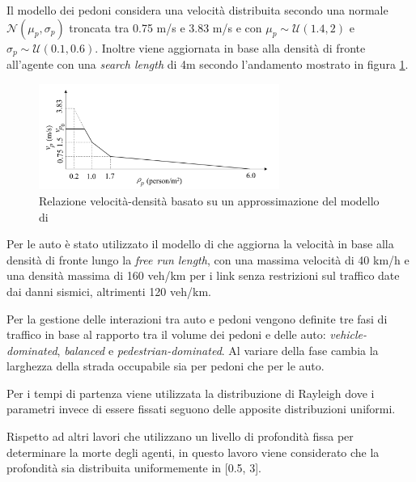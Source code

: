 Il modello dei pedoni considera una velocità distribuita secondo una normale $\mathcal{N}(\mu_p,\sigma_p)$ troncata tra 0.75 m/s e 3.83 m/s e
con $\mu_p \sim \mathcal{U}(1.4, 2)$ e $\sigma_p \sim \mathcal{U}(0.1, 0.6)$.
Inoltre viene aggiornata in base alla densità di fronte all'agente con una \textit{search length} di 4m secondo l'andamento mostrato in figura \ref*{fig:dadknakdand}.

\begin{figure}[ht]
    \centering
    \includegraphics[width=0.7\textwidth]{images/speed_WANG.png}
    \caption{Relazione velocità-densità \textcite{wang2021novel} basato su un approssimazione del modello di \textcite{goto2012tsunami}}
    \label{fig:dadknakdand}
\end{figure}

Per le auto è stato utilizzato il modello di \textcite{greenshields1935study} che aggiorna la velocità in base alla densità di fronte lungo la \textit{free run length},
con una massima velocità di 40 km/h e una densità massima di 160 veh/km per i link senza restrizioni sul traffico date dai danni sismici, altrimenti 120 veh/km.

Per la gestione delle interazioni tra auto e pedoni vengono definite tre fasi di traffico in base al rapporto
tra il volume dei pedoni e delle auto: \textit{vehicle-dominated}, \textit{balanced} e \textit{pedestrian-dominated}.
Al variare della fase cambia la larghezza della strada occupabile sia per pedoni che per le auto.

Per i tempi di partenza viene utilizzata la distribuzione di Rayleigh dove i parametri
invece di essere fissati seguono delle apposite distribuzioni uniformi.

Rispetto ad altri lavori che utilizzano un livello di profondità fissa per determinare la morte degli agenti, in questo lavoro
viene considerato che la profondità sia distribuita uniformemente in [0.5, 3]. 
